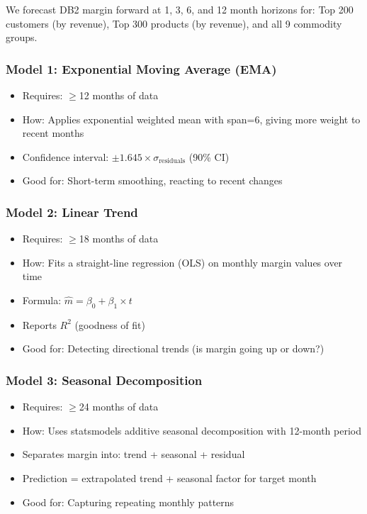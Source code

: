 \documentclass[11pt,a4paper]{article}
\begin{document}
We forecast DB2 margin forward at 1, 3, 6, and 12 month horizons for: Top 200 customers (by revenue), Top 300 products (by revenue), and all 9 commodity groups.

\subsubsection{Model 1: Exponential Moving Average (EMA)}
\begin{itemize}[nosep]
  \item Requires: $\geq$12 months of data
  \item How: Applies exponential weighted mean with span=6, giving more weight to recent months
  \item Confidence interval: $\pm 1.645 \times \sigma_{\text{residuals}}$ (90\% CI)
  \item Good for: Short-term smoothing, reacting to recent changes
\end{itemize}

\subsubsection{Model 2: Linear Trend}
\begin{itemize}[nosep]
  \item Requires: $\geq$18 months of data
  \item How: Fits a straight-line regression (OLS) on monthly margin values over time
  \item Formula: $\hat{m} = \beta_0 + \beta_1 \times t$
  \item Reports $R^2$ (goodness of fit)
  \item Good for: Detecting directional trends (is margin going up or down?)
\end{itemize}

\subsubsection{Model 3: Seasonal Decomposition}
\begin{itemize}[nosep]
  \item Requires: $\geq$24 months of data
  \item How: Uses statsmodels additive seasonal decomposition with 12-month period
  \item Separates margin into: trend + seasonal + residual
  \item Prediction = extrapolated trend + seasonal factor for target month
  \item Good for: Capturing repeating monthly patterns
\end{itemize}
\end{document}
